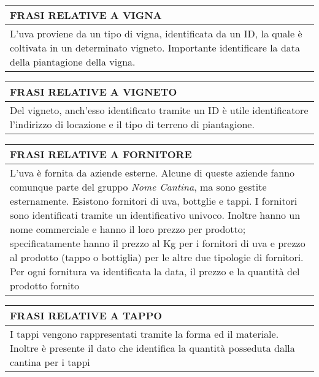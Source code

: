 \begin{center}
	\begin{tabular}{P{16cm}}
		\toprule
		 \textbf {\large {FRASI RELATIVE A VIGNA}} \\
		\midrule
		L'uva proviene da un tipo di vigna, identificata da un ID, la quale è coltivata in un determinato vigneto. Importante identificare la data della piantagione della vigna.\\
		\bottomrule
	\end{tabular}

	\vspace{0.5cm}
	
	\begin{tabular}{P{16cm}}
		\toprule
		 \textbf {\large {FRASI RELATIVE A VIGNETO}} \\
		\midrule
		Del vigneto, anch'esso identificato tramite un ID è utile identificatore l'indirizzo di locazione e il tipo di terreno di piantagione.\\
		\bottomrule
	\end{tabular}
	
	\vspace{0.5cm}
	
	\begin{tabular}{P{16cm}}
		\toprule
		 \textbf {\large {FRASI RELATIVE A FORNITORE}} \\
		\midrule
		L'uva è fornita da aziende esterne. Alcune di queste aziende fanno comunque parte del gruppo \emph{Nome Cantina}, ma sono gestite esternamente. Esistono fornitori di uva, bottglie e tappi.
I fornitori sono identificati tramite un identificativo univoco. Inoltre hanno un nome commerciale e hanno il loro prezzo per prodotto; specificatamente hanno il prezzo al Kg per i fornitori di uva e prezzo al prodotto (tappo o bottiglia) per le altre due tipologie di fornitori. Per ogni fornitura va identificata la data, il prezzo e la quantità del prodotto fornito\\
		\bottomrule
	\end{tabular}
	
	\vspace{0.5cm}
	
	\begin{tabular}{P{16cm}}
		\toprule
		 \textbf {\large {FRASI RELATIVE A TAPPO}} \\
		\midrule
		I tappi vengono rappresentati tramite la forma ed il materiale. Inoltre è presente il dato che identifica la quantità posseduta dalla cantina per i tappi\\
		\bottomrule
	\end{tabular}
	

\end{center}

